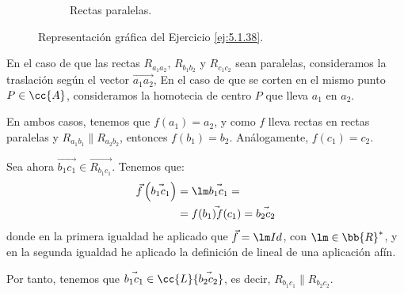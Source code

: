\begin{ejercicio}
\begin{figure}[H]
\begin{subfigure}{0.5\linewidth}
            \caption{\centering Rectas paralelas.}
        \end{subfigure}
        \caption{\centering Representación gráfica del Ejercicio \ref{ej:5.1.38}.}
    \end{figure}

    En el caso de que las rectas $R_{a_1a_2}$, $R_{b_1b_2}$ y $R_{c_1c_2}$ sean paralelas,
    consideramos la traslación según el vector $\vec{a_1a_2}$, En el caso de que se corten en el mismo punto $P\in \cc{A}$,
    consideramos la homotecia de centro $P$ que lleva $a_1$ en $a_2$.

    En ambos casos, tenemos que $f(a_1)=a_2$, y como $f$ lleva rectas en rectas paralelas
    y $R_{a_1b_1}\|R_{a_2b_2}$, entonces $f(b_1)=b_2$. Análogamente, $f(c_1)=c_2$.

    Sea ahora $\vec{b_1c_1}\in \vec{R_{b_1c_1}}$. Tenemos que:
    \begin{align*}
        \vec{f}\left(\vec{b_1c_1}\right) &= \lm \vec{b_1c_1} =\\
        &= \vec{f(b_1)f(c_1)} = \vec{b_2c_2}
    \end{align*}
    donde en la primera igualdad he aplicado que $\vec{f}=\lm Id$, con $\lm \in \bb{R}^\ast$,
    y en la segunda igualdad he aplicado la definición de lineal de una aplicación afín.

    Por tanto, tenemos que $\vec{b_1c_1}\in \cc{L}\{\vec{b_2c_2}\}$, es decir, $R_{b_1c_1}\|R_{b_2c_2}$.
\end{ejercicio}



